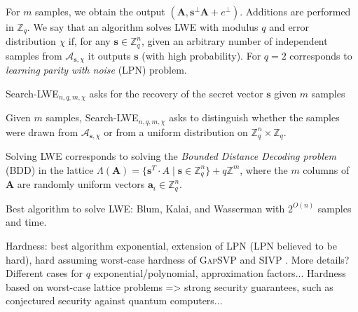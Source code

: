 \documentclass[
  a4paper,  %
  twoside,  %
  bibliography=totoc,
  headsepline,
  cleardoublepage=empty,
  parskip=half,
  draft=false
]{scrbook}
\begin{document}
For $m$ samples, we obtain the output $(\textbf{A}, \textbf{s}^\perp \textbf{A} + e^\perp)$. Additions are performed in $\mathbb{Z}_q$. We say that an algorithm solves LWE with modulus $q$ and error distribution $\chi$ if, for any $\textbf{s} \in \mathbb{Z}_q^n$, given an arbitrary number of independent samples from $\mathcal{A}_{\textbf{s}, \chi}$ it outputs $\textbf{s}$ (with high probability). For $q=2$ corresponds to \textit{learning parity with noise} (LPN) problem.

\begin{definition}
  Search-LWE$_{n, q, m, \chi}$ asks for the recovery of the secret vector $\textbf{s}$ given $m$ samples %
\end{definition}

\begin{definition}
  Given $m$ samples, Search-LWE$_{n, q, m, \chi}$ asks to distinguish whether the samples were drawn from  $\mathcal{A}_{\textbf{s}, \chi}$ or from a uniform distribution on $\mathbb{Z}_q^n \times \mathbb{Z}_q$.
\end{definition}




Solving LWE corresponds to solving the \textit{Bounded Distance Decoding problem} (BDD) in the lattice $\Lambda(\textbf{A}) = \{ \textbf{s}^{T} \cdot A \mid \textbf{s} \in \mathbb{Z}_q^n\} + q \mathbb{Z}^m$, where the $m$ columns of $\textbf{A}$ are randomly uniform vectors $\textbf{a}_i \in \mathbb{Z}_q^n$. %

Best algorithm to solve LWE: Blum, Kalai, and Wasserman \cite{BKW03} with $2^{O(n)}$ samples and time. %

Hardness: best algorithm exponential, extension of LPN (LPN believed to be hard), hard assuming worst-case hardness of \textsc{GapSVP} %
and \textsc{SIVP} \cite{Reg05, Pei09}. More details? Different cases for $q$ exponential/polynomial, approximation factors...
Hardness based on worst-case lattice problems => strong security guarantees, such as conjectured security against quantum computers...
 
\end{document}
